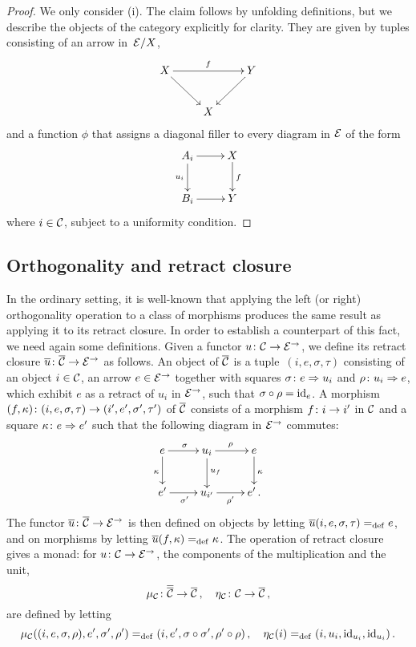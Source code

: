 \documentclass[reqno,10pt,a4paper,oneside]{amsart}
\begin{document}
\begin{proof} We only consider (i). The claim follows by unfolding definitions, but we describe the objects of the category explicitly for clarity. They are given by 
tuples consisting of an arrow in~$\cal{E}/X$, 
\[
\xymatrix{
X \ar[dr] \ar[rr]^f  &  & Y \ar[dl] \\
 & X & }
 \]
and a function $\phi$ that assigns a diagonal filler to every diagram in $\cal{E}$ of the form
\[
\xymatrix{
A_i \ar[r] \ar[d]_{u_i} & X \ar[d]^{f} \\
B_i \ar[r] & Y}
\]
where $i \in \cal{C}$, subject to a uniformity condition. 
\end{proof}

\medskip

\subsection*{Orthogonality and retract closure} In the ordinary setting, it is well-known that
applying the left (or right) orthogonality operation to a class of morphisms produces the same result as applying it to its retract closure. 
In order to establish a counterpart of this fact, we need again some definitions. 
Given a  functor $u \co \cal{C} \to \catE^{\to}$, we define its retract closure $\overline{u} \co \overline{\cal{C}} \to \catE^{\to}$ as follows. 
An object of $\overline{\cal{C}}$ is a tuple~$(i, e, \sigma, \tau)$ consisting of an object $i \in \cal{C}$, an arrow $e \in \cal{E}^\to$ together with squares $\sigma \co e \Rightarrow u_i$ and $\rho \co u_i \Rightarrow e$,
which exhibit $e$ as a retract of $u_i$ in  $\catE^{\to}$,  \ie such that $\sigma \cc \rho = \id_e$. 
A morphism $(f, \kappa) \co (i, e, \sigma, \tau) \to (i', e', \sigma', \tau')$ of $\overline{\cal{C}}$  consists of a morphism $f \co i \to i'$ in $\cal{C}$ and a square $\kappa \co e \Rightarrow e'$  such that the following diagram in $\cal{E}^\to$ commutes:
\[
\xymatrix{
  e
  \ar[r]^{\sigma}
    \ar[d]_{\kappa}
&
  u_i
  \ar[r]^{\rho}
  \ar[d]^{u_f}
&
  e
  \ar[d]^{\kappa}
\\
  e'
  \ar[r]_{\sigma'}
&
  u_{i'}
  \ar[r]_{\rho'}
&
  e' \, .
}
\]
The functor $\overline{u} \co \overline{\cal{C}} \to \catE^\to$ is then defined  on objects  by letting 
$\overline{u}(i, e, \sigma, \tau) \defeq e$,
and on morphisms by letting $\overline{u}(f, \kappa) \defeq \kappa$. The operation of retract closure gives a monad: for $u \co \cal{C} \to \catE^{\to}$,
the components of the multiplication and the unit, 
\[
\mu_\cal{C} \co \overline{\overline{\cal{C}}} \to \overline{\cal{C}} \, , \quad
\eta_\cal{C} \co \cal{C} \to \overline{\cal{C}} \, ,
\]
are defined by letting
\[
\mu_\cal{C}((i, e, \sigma,  \rho), e', \sigma', \rho') \defeq (i, e', \sigma \cc \sigma', \rho' \cc \rho) \, , \quad
\eta_\cal{C}(i) \defeq (i, u_i, \id_{u_i}, \id_{u_i}) \, .
\]
\end{document}
